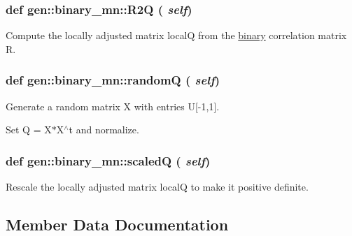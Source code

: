 \hypertarget{classgen_1_1binary__mn_2e6f5771808178612aefbeebe6737f18}{
\subsubsection[{R2Q}]{\setlength{\rightskip}{0pt plus 5cm}def gen::binary\_\-mn::R2Q ( {\em self})}}
\label{classgen_1_1binary__mn_2e6f5771808178612aefbeebe6737f18}


Compute the locally adjusted matrix localQ from the \hyperlink{classgen_1_1binary}{binary} correlation matrix R. 

\hypertarget{classgen_1_1binary__mn_5c42384da221ad688d6e1a344606a017}{
\subsubsection[{randomQ}]{\setlength{\rightskip}{0pt plus 5cm}def gen::binary\_\-mn::randomQ ( {\em self})}}
\label{classgen_1_1binary__mn_5c42384da221ad688d6e1a344606a017}


Generate a random matrix X with entries U\mbox{[}-1,1\mbox{]}. 

Set Q = X$\ast$X$^\wedge$t and normalize. \hypertarget{classgen_1_1binary__mn_6e5ed2fe6e5b8c6540c797d4a49421bf}{
\subsubsection[{scaledQ}]{\setlength{\rightskip}{0pt plus 5cm}def gen::binary\_\-mn::scaledQ ( {\em self})}}
\label{classgen_1_1binary__mn_6e5ed2fe6e5b8c6540c797d4a49421bf}


Rescale the locally adjusted matrix localQ to make it positive definite. 



\subsection{Member Data Documentation}
\hypertarget{classgen_1_1binary__mn_30427a1bc1bbc9f50e67e20d763c9c1e}{
\subsubsection[{C}]{}}
\label{classgen_1_1binary__mn_30427a1bc1bbc9f50e67e20d763c9c1e}


